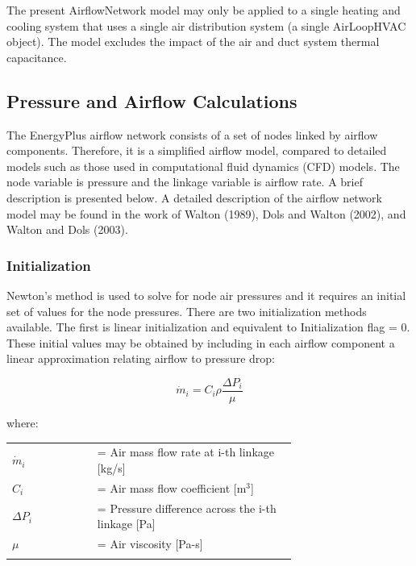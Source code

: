 The present AirflowNetwork model may only be applied to a single heating and cooling system that uses a single air distribution system (a single AirLoopHVAC object). The model excludes the impact of the air and duct system thermal capacitance.

\subsection{Pressure and Airflow Calculations}\label{pressure-and-airflow-calculations}

The EnergyPlus airflow network consists of a set of nodes linked by airflow components. Therefore, it is a simplified airflow model, compared to detailed models such as those used in computational fluid dynamics (CFD) models. The node variable is pressure and the linkage variable is airflow rate. A brief description is presented below. A detailed description of the airflow network model may be found in the work of Walton (1989), Dols and Walton (2002), and Walton and Dols (2003).

\subsubsection{Initialization}\label{initialization}

Newton's method is used to solve for node air pressures and it requires an initial set of values for the node pressures. There are two initialization methods available. The first is linear initialization and equivalent to Initialization flag = 0. These initial values may be obtained by including in each airflow component a linear approximation relating airflow to pressure drop:

\begin{equation}
  \dot{m}_{i} = C_{i}\rho\frac{\Delta P_i}{\mu}
\end{equation}

where:

\begin{tabular}{lp{0.7\linewidth}}
\\
$\dot{m}_i$ &= Air mass flow rate at i-th linkage [kg/s] \\
$C_i$ &= Air mass flow coefficient [m\(^{3}\)] \\
$\Delta P_i$ &= Pressure difference across the i-th linkage [Pa] \\
$\mu$ &= Air viscosity [Pa-s] \\
\\
\end{tabular}

